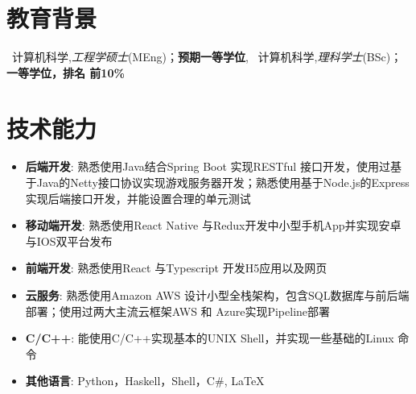 \documentclass{resume}
\begin{document}


 

\section{教育背景}
\ 计算机科学,\textit{工程学硕士}(MEng)；\textbf{预期一等学位},
\ 计算机科学,\textit{理科学士}(BSc)；\textbf{一等学位，排名 前10\%}

\section{技术能力}
\begin{itemize}[parsep=0.2ex]
  \item \textbf{后端开发}: 熟悉使用Java结合Spring Boot 实现RESTful 接口开发，使用过基于Java的Netty接口协议实现游戏服务器开发；熟悉使用基于Node.js的Express实现后端接口开发，并能设置合理的单元测试
  \item \textbf{移动端开发}: 熟悉使用React Native 与Redux开发中小型手机App并实现安卓与IOS双平台发布
  \item \textbf{前端开发}: 熟悉使用React 与Typescript 开发H5应用以及网页
  \item \textbf{云服务}: 熟悉使用Amazon AWS 设计小型全栈架构，包含SQL数据库与前后端部署；使用过两大主流云框架AWS 和 Azure实现Pipeline部署
  \item \textbf{C/C++}: 能使用C/C++实现基本的UNIX Shell，并实现一些基础的Linux 命令 
  \item \textbf{其他语言}: Python，Haskell，Shell，C\#, \LaTeX
\end{itemize}
\end{document}

